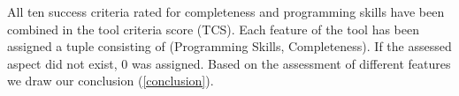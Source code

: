All ten success criteria rated for completeness and programming skills have been combined in the tool criteria score  (\gls{TCS}). Each feature of the tool has been assigned a tuple consisting of  (Programming Skills, Completeness). If the assessed aspect did not exist, 0 was assigned.
Based on the assessment of different features  we draw our conclusion  (\ref{conclusion}).



